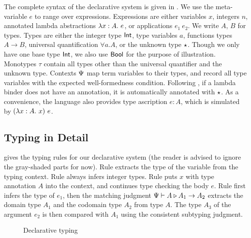 The complete syntax of the declarative system is given in
. We use the meta-variable $e$ to range over expressions.
Expressions are either variables $x$, integers $n$, annotated lambda
abstractions $\lambda x:A.~ e$, or applications $e_1 ~ e_2$. We write $A$, $B$ for
types. Types are either the integer type $\mathsf{Int}$, type variables $a$, functions
types $A \to B$, universal quantification $\forall a. A$, or the unknown type
$\star$. Though we only have one base type $\mathsf{Int}$, we also use $\mathsf{Bool}$ for
the purpose of illustration. Monotypes $\tau$ contain all types other than the
universal quantifier and the unknown type. Contexts $\Psi$ map term variables
to their types, and record all type variables with the expected well-formedness
condition. Following \citet{siek2006gradual}, if a lambda binder does not have
an annotation, it is automatically annotated with $\star$. As a convenience,
the language also provides type ascription $e : A$, which is simulated by
$(\lambda x:A.~ x) ~ e$.

\subsection{Typing in Detail}

 gives the typing rules for our declarative system
(the reader is advised to ignore the gray-shaded parts for now). Rule 
extracts the type of the variable from the typing context. Rule  always
infers integer types. Rule  puts $x$ with type annotation $A$ into
the context, and continues type checking the body $e$. Rule  first
infers the type of $e_1$, then the matching judgment $\Psi {} \vdash A \triangleright A_1
\to A_2$ extracts the domain type $A_1$ and the codomain type $A_2$ from type
$A$. The type $A_3$ of the argument $e_2$ is then compared with $A_1$ using the
consistent subtyping judgment.

\renewcommand{\trto}[1]{\hlmath{\rightsquigarrow{#1}}}
\begin{figure}[t]
  \begin{small}


  \end{small}
  \caption{Declarative typing}
  \label{fig:decl-typing}
\end{figure}

